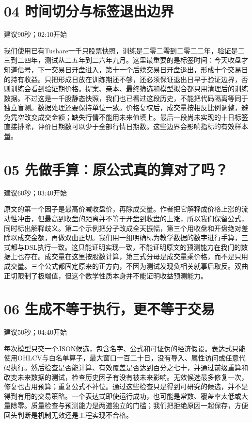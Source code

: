 \documentclass[UTF8,a4paper,11pt]{ctexart}
\begin{document}
\section*{\color{ink}04 时间切分与标签退出边界}
{\small\color{accent}建议90秒；02:10开始}\par
我们使用已有Tushare一千只股票快照，训练是二零二零到二零二二年，验证是二三到二四年，测试从二五年到二六年九月。这里最重要的是标签时间：今天收盘才知道信号，下一交易日开盘进入，第十一个后续交易日开盘退出，形成十个交易日的持有收益。只把形成日放在训练期还不够，还必须保证退出日早于验证边界，否则训练会看到验证期价格。提案、亲本、最终筛选和模型拟合都只用清理后的训练数据。不过这是一千股静态快照，我们也已看过这段历史，不能把代码隔离等同于独立盲测。数据处理还要保持单位一致。价格复权后，成交量按相反比例调整，避免凭空改变成交金额；缺失行情不能用未来值填上。最后一段尚未实现的十日标签直接排除，评价日期数可以少于全部行情日期数。这些边界会影响指标的有效样本量。
\newpage
\section*{\color{ink}05 先做手算：原公式真的算对了吗？}
{\small\color{accent}建议60秒；03:40开始}\par
原文的第一个因子是最高价减收盘价，再除成交量。作者把它解释成价格上涨的流动性冲击，但最高到收盘的距离并不等于开盘到收盘的上涨，所以我们保留公式，同时标出解释歧义。第二个示例把分子改成全天振幅，第三个用收盘和开盘绝对差除以成交金额，再做双曲正切。我们用一组明确标为教学数据的数字进行手算，三式都与DSL执行一致。这只能证明实现一致，不能证明原文的预测能力在我们的数据上也存在。成交量在这里按股数计算，第三式分母是成交量乘价格，而不是只用成交量。三个公式都固定原来的正方向，不因为测试发现负相关就事后取反。双曲正切限制了极端值，但这个数学性质本身并不能证明收益预测能力。
\section*{\color{ink}06 生成不等于执行，更不等于交易}
{\small\color{accent}建议50秒；04:40开始}\par
每次模型只交一个JSON候选，包含名字、公式和可证伪的经济假设。表达式只能使用OHLCV与白名单算子，最大窗口一百二十日，没有导入、属性访问或任意代码执行。然后检查是否能计算、有效覆盖是否达到百分之七十，并通过前缀重算和改变未来数据的测试，检查历史因子有没有被未来影响。无效候选最多修复一次，修复也占用预算；重复公式不补位。通过这些检查只是得到可研究的候选，并不是得到有用的交易策略。一个表达式即使运行成功，也可能是常数、覆盖率太低或大量除零。质量检查与预测能力是两道独立的门槛；我们把拒绝原因一起保存，方便回头判断是机制无效还是工程实现不合格。
\newpage
\end{document}
